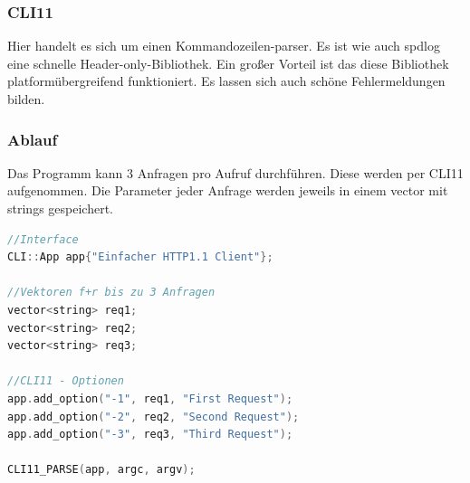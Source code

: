 \documentclass{article}
\begin{document}
\subsubsection{CLI11}
Hier handelt es sich um einen Kommandozeilen-parser. Es ist wie auch spdlog eine schnelle Header-only-Bibliothek. Ein großer Vorteil ist das diese Bibliothek platformübergreifend funktioniert. Es lassen sich auch schöne Fehlermeldungen bilden. 

\subsubsection{Ablauf}
Das Programm kann 3 Anfragen pro Aufruf durchführen. Diese werden per CLI11 aufgenommen. Die Parameter jeder Anfrage werden jeweils in einem vector mit strings gespeichert.

\begin{lstlisting}[language=C++]
//Interface
CLI::App app{"Einfacher HTTP1.1 Client"};

//Vektoren f+r bis zu 3 Anfragen
vector<string> req1;
vector<string> req2;
vector<string> req3;

//CLI11 - Optionen
app.add_option("-1", req1, "First Request");
app.add_option("-2", req2, "Second Request");
app.add_option("-3", req3, "Third Request");

CLI11_PARSE(app, argc, argv);
\end{lstlisting}
\end{document}
